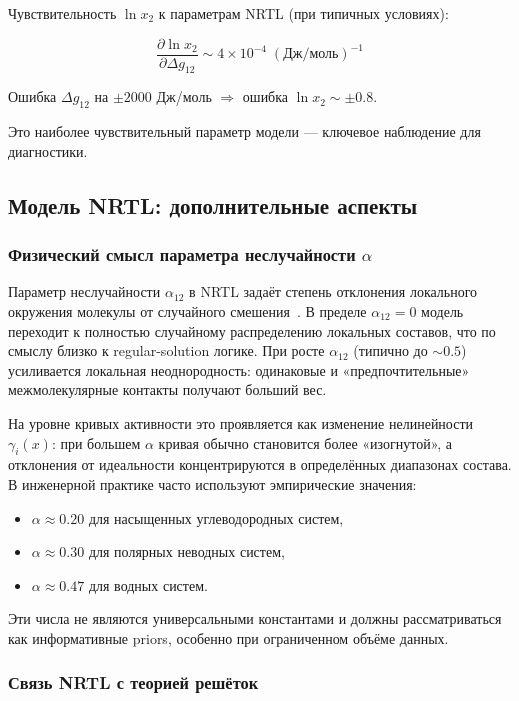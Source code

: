 \documentclass[11pt]{article}
\begin{document}
Чувствительность $\ln x_2$ к параметрам NRTL (при типичных условиях):

\begin{equation*}
\frac{\partial \ln x_2}{\partial \Delta g_{12}} \sim 4 \times 10^{-4} \; (\text{Дж/моль})^{-1}
\end{equation*}

Ошибка $\Delta g_{12}$ на $\pm 2000$ Дж/моль $\Rightarrow$ ошибка $\ln x_2 \sim \pm 0.8$.

Это наиболее чувствительный параметр модели --- ключевое наблюдение для диагностики.


\subsection{Модель NRTL: дополнительные аспекты}

\subsubsection{Физический смысл параметра неслучайности $\alpha$}

Параметр неслучайности $\alpha_{12}$ в NRTL задаёт степень отклонения локального окружения молекулы от случайного смешения~\cite{renon1968,prausnitz1998}. В пределе $\alpha_{12}=0$ модель переходит к полностью случайному распределению локальных составов, что по смыслу близко к regular-solution логике. При росте $\alpha_{12}$ (типично до $\sim 0.5$) усиливается локальная неоднородность: одинаковые и «предпочтительные» межмолекулярные контакты получают больший вес.

На уровне кривых активности это проявляется как изменение нелинейности $\gamma_i(x)$: при большем $\alpha$ кривая обычно становится более «изогнутой», а отклонения от идеальности концентрируются в определённых диапазонах состава. В инженерной практике часто используют эмпирические значения:
\begin{itemize}
  \item $\alpha \approx 0.20$ для насыщенных углеводородных систем,
  \item $\alpha \approx 0.30$ для полярных неводных систем,
  \item $\alpha \approx 0.47$ для водных систем.
\end{itemize}

Эти числа не являются универсальными константами и должны рассматриваться как информативные priors, особенно при ограниченном объёме данных.

\subsubsection{Связь NRTL с теорией решёток}
\end{document}

